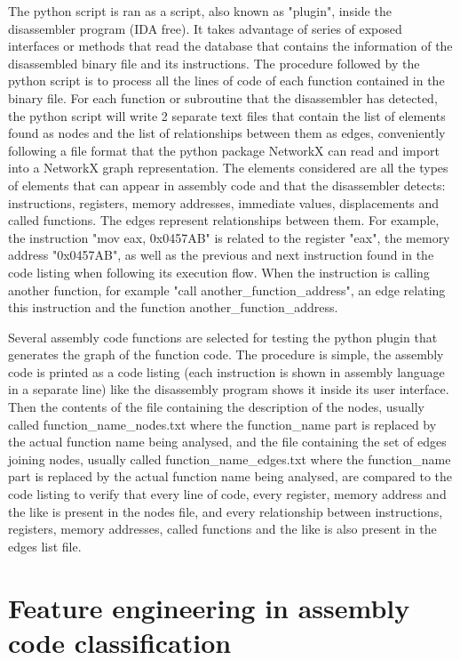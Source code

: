 \begin{appendices}
The python script is ran as a script, also known as "plugin", inside the disassembler program (IDA free). It takes advantage of series of exposed interfaces or methods that read the database that contains the information of the disassembled binary file and its instructions. The procedure followed by the python script is to process all the lines of code of each function contained in the binary file. For each function or subroutine that the disassembler has detected, the python script will write 2 separate text files that contain the list of elements found as nodes and the list of relationships between them as edges, conveniently following a file format that the python package NetworkX can read and import into a NetworkX graph representation. 
The elements considered are all the types of elements that can appear in assembly code and that the disassembler detects: instructions, registers, memory addresses, immediate values, displacements and called functions. The edges represent relationships between them. For example, the instruction "mov eax, 0x0457AB" is related to the register "eax", the memory address "0x0457AB", as well as the previous and next instruction found in the code listing when following its execution flow. When the instruction is calling another function, for example "call another_function_address", an edge relating this instruction and the function another_function_address. 


Several assembly code functions are selected for testing the python plugin that generates the graph of the function code. The procedure is simple, the assembly code is printed as a code listing (each instruction is shown in assembly language in a separate line) like the disassembly program shows it inside its user interface. Then the contents of the file containing the description of the nodes, usually called function_name_nodes.txt where the function_name part is replaced by the actual function name being analysed, and the file containing the set of edges joining nodes, usually called function_name_edges.txt where the function_name part is replaced by the actual function name being analysed, are compared to the code listing to verify that every line of code, every register, memory address and the like is present in the nodes file, and every relationship between instructions, registers, memory addresses, called functions and the like is also present in the edges list file.

\section{Feature engineering in assembly code classification}


\end{appendices}
